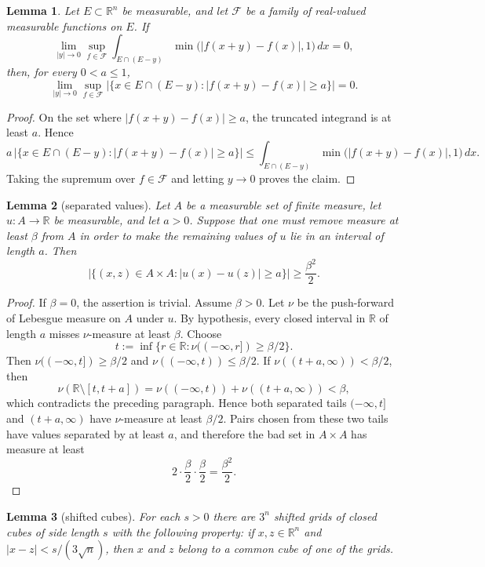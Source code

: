\documentclass[11pt]{article}
\theoremstyle{plain}
\newtheorem{lemma}{Lemma}
\theoremstyle{definition}
\theoremstyle{remark}
\newcommand{\R}{\mathbb{R}}
\newcommand{\F}{\mathcal{F}}
\newcommand{\meas}[1]{\lvert #1\rvert}
\begin{document}
\begin{lemma}\label{lem:bad-measure-from-translation}
Let $E\subset\R^n$ be measurable, and let $\F$ be a family of real-valued
measurable functions on $E$. If
\[
    \lim_{|y|\to0}\sup_{f\in\F}
    \int_{E\cap(E-y)}
    \min\bigl(|f(x+y)-f(x)|,1\bigr)\,dx=0,
\]
then, for every $0<a\le1$,
\[
    \lim_{|y|\to0}\sup_{f\in\F}
    \meas{\{x\in E\cap(E-y): |f(x+y)-f(x)|\ge a\}}=0.
\]
\end{lemma}

\begin{proof}
On the set where $|f(x+y)-f(x)|\ge a$, the truncated integrand is at least
$a$. Hence
\[
    a\,\meas{\{x\in E\cap(E-y): |f(x+y)-f(x)|\ge a\}}
    \le
    \int_{E\cap(E-y)}
    \min\bigl(|f(x+y)-f(x)|,1\bigr)\,dx .
\]
Taking the supremum over $f\in\F$ and letting $y\to0$ proves the claim.
\end{proof}

\begin{lemma}[separated values]\label{lem:separated-values}
Let $A$ be a measurable set of finite measure, let $u:A\to\R$ be measurable,
and let $a>0$. Suppose that one must remove measure at least $\beta$ from
$A$ in order to make the remaining values of $u$ lie in an interval of length
$a$. Then
\[
    \meas{\{(x,z)\in A\times A: |u(x)-u(z)|\ge a\}}
    \ge \frac{\beta^2}{2}.
\]
\end{lemma}

\begin{proof}
If $\beta=0$, the assertion is trivial. Assume $\beta>0$. Let $\nu$ be the
push-forward of Lebesgue measure on $A$ under $u$. By hypothesis, every
closed interval in $\R$ of length $a$ misses $\nu$-measure at least $\beta$.
Choose
\[
    t:=\inf\{r\in\R:\nu((-\infty,r])\ge\beta/2\}.
\]
Then $\nu((-\infty,t])\ge\beta/2$ and
$\nu((-\infty,t))\le\beta/2$. If
$\nu((t+a,\infty))<\beta/2$, then
\[
    \nu(\R\setminus[t,t+a])
    =
    \nu((-\infty,t))+\nu((t+a,\infty))
    <\beta,
\]
which contradicts the preceding paragraph. Hence both separated tails
$(-\infty,t]$ and $(t+a,\infty)$ have $\nu$-measure at least $\beta/2$.
Pairs chosen from these two tails have values separated by at least $a$, and
therefore the bad set in $A\times A$ has measure at least
\[
    2\cdot\frac{\beta}{2}\cdot\frac{\beta}{2}
    =\frac{\beta^2}{2}.
\]
\end{proof}

\begin{lemma}[shifted cubes]\label{lem:shifted-cubes}
For each $s>0$ there are $3^n$ shifted grids of closed cubes of side length
$s$ with the following property: if $x,z\in\R^n$ and
$|x-z|<s/(3\sqrt n)$, then $x$ and $z$ belong to a common cube of one of
the grids.
\end{lemma}
\end{document}
